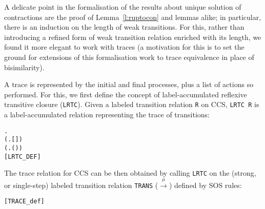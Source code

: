 A delicate point in the formalisation of the results about unique solution of
contractions are the proof of Lemma~\ref{l:ruptocon} and lemmas alike;
in particular, there is
 an induction on the length of weak transitions. 
For this, rather than 
 introducing a refined form of weak transition relation
enriched with its length, 
we found it more elegant  to  work with traces
(a motivation for this is to set the ground for extensions of this
formalisation work to trace equivalence in place of bisimilarity).



A trace is represented by the initial and final processes, plus
a list of actions  so performed.
For this, we first 
 define the concept of label-accumulated reflexive transitive closure
 (\texttt{LRTC}).
Given a labeled transition relation \texttt{R} on CCS, \texttt{LRTC R} is
a label-accumulated relation representing the trace of transitions:
\begin{alltt}
     \HOLSymConst{\HOLTokenEquiv{}}
\HOLSymConst{\HOLTokenForall{}}.
    (\HOLSymConst{\HOLTokenForall{}}.   [] ) \HOLSymConst{\HOLTokenConj{}}
    (\HOLSymConst{\HOLTokenForall{}}    .     \HOLSymConst{\HOLTokenConj{}}     \HOLSymConst{\HOLTokenImp{}}   (\HOLSymConst{::}) ) \HOLSymConst{\HOLTokenImp{}}
       \hfill{[LRTC_DEF]}
\end{alltt}
The trace relation for CCS can be then obtained
 by calling \texttt{LRTC} on the (strong, or single-step) labeled transition
 relation \texttt{TRANS} ($\overset{\mu}{\rightarrow}$) defined by SOS rules:
\begin{alltt}
 \HOLSymConst{=}  \hfill{[TRACE_def]}
\end{alltt}

